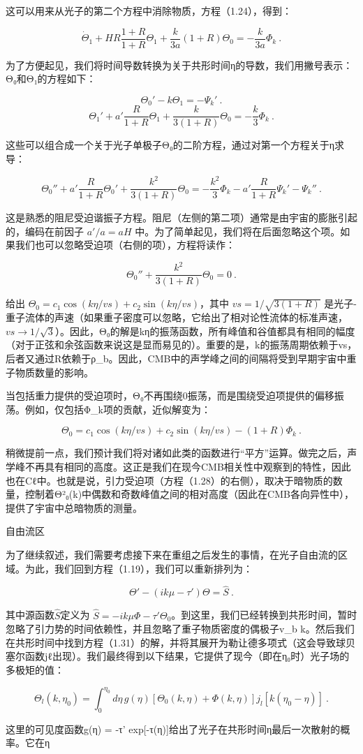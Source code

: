 这可以用来从光子的第二个方程中消除物质，方程（1.24），得到：

\[ \dot{\Theta}_1 + H R \frac{1 + R}{1 + R} \Theta_1 + \frac{k}{3a} (1 + R) \Theta_0 = -\frac{k}{3a} \Phi_k ~.\]

为了方便起见，我们将时间导数转换为关于共形时间η的导数，我们用撇号表示：Θ₀和Θ₁的方程如下：

\[ \Theta_0' - k \Theta_1 = -\Psi_k'~. \]
\[ \Theta_1' + a' \frac{R}{1 + R} \Theta_1 + \frac{k}{3(1 + R)} \Theta_0 = -\frac{k}{3} \Phi_k~. \]

这些可以组合成一个关于光子单极子Θ₀的二阶方程，通过对第一个方程关于η求导：

\[ \Theta_0'' + a' \frac{R}{1 + R} \Theta_0' + \frac{k^2}{3(1 + R)} \Theta_0 = -\frac{k^2}{3} \Phi_k - a' \frac{R}{1 + R} \Psi_k' - \Psi_k''~. \]

这是熟悉的阻尼受迫谐振子方程。阻尼（左侧的第二项）通常是由宇宙的膨胀引起的，编码在前因子 \( a'/a = aH \) 中。为了简单起见，我们将在后面忽略这个项。如果我们也可以忽略受迫项（右侧的项），方程将读作：

\[ \Theta_0'' + \frac{k^2}{3(1 + R)} \Theta_0 = 0~. \]

给出 \( \Theta_0 = c_1 \cos(k\eta/vs) + c_2 \sin(k\eta/vs) \)，其中 \( vs = 1/\sqrt{3(1 + R)} \) 是光子-重子流体的声速（如果重子密度可以忽略，它给出了相对论性流体的标准声速，\( vs \rightarrow 1/\sqrt{3} \)）。因此，Θ₀的解是kη的振荡函数，所有峰值和谷值都具有相同的幅度（对于正弦和余弦函数来说这是显而易见的）。重要的是，k的振荡周期依赖于vs，后者又通过R依赖于ρ_b。因此，CMB中的声学峰之间的间隔将受到早期宇宙中重子物质数量的影响。

当包括重力提供的受迫项时，Θ₀不再围绕0振荡，而是围绕受迫项提供的偏移振荡。例如，仅包括Φ_k项的贡献，近似解变为：

\[ \Theta_0 = c_1 \cos(k\eta/vs) + c_2 \sin(k\eta/vs) - (1 + R) \Phi_k~. \]

稍微提前一点，我们预计我们将对诸如此类的函数进行“平方”运算。做完之后，声学峰不再具有相同的高度。这正是我们在现今CMB相关性中观察到的特性，因此也在Cℓ中。也就是说，引力受迫项（方程（1.28）的右侧），取决于暗物质的数量，控制着Θ²₀(k)中偶数和奇数峰值之间的相对高度（因此在CMB各向异性中），提供了宇宙中总暗物质的测量。

自由流区

为了继续叙述，我们需要考虑接下来在重组之后发生的事情，在光子自由流的区域。为此，我们回到方程（1.19），我们可以重新排列为：

\[ \Theta' - (ik\mu - \tau') \Theta = \hat{S}~. \]

其中源函数\( \hat{S} \)定义为 \( \hat{S} = -ik\mu \Phi - \tau' \Theta_0 \)。到这里，我们已经转换到共形时间，暂时忽略了引力势的时间依赖性，并且忽略了重子物质密度的偶极子v_b k。然后我们在共形时间中找到方程（1.31）的解，并将其展开为勒让德多项式（这会导致球贝塞尔函数jℓ出现）。我们最终得到以下结果，它提供了现今（即在η₀时）光子场的多极矩的值：

\[ \Theta_l(k, \eta_0) = \int_0^{\eta_0} d\eta \, g(\eta) \left[ \Theta_0(k, \eta) + \Phi(k, \eta) \right] j_l[k(\eta_0 - \eta)]~.\]

这里的可见度函数g(η) = -τ' exp[-τ(η)]给出了光子在共形时间η最后一次散射的概率。它在η 

